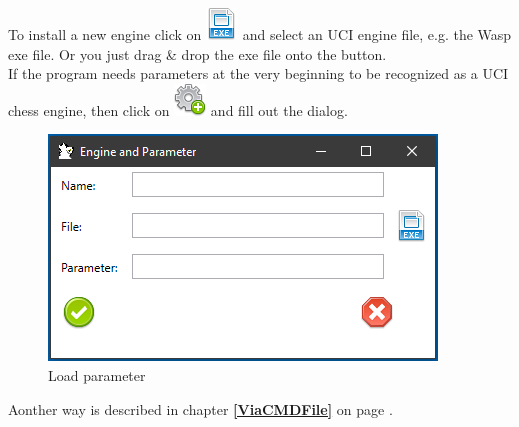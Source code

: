 \documentclass[11pt,a4paper]{article}
\begin{document}
To install a new engine click on \includegraphics[scale=0.5]{file_extension_exe.png} and select an UCI engine file, e.g. the Wasp exe file. Or you just drag \& drop the exe file onto the button.\\
If the program needs parameters at the very beginning to be recognized as a UCI chess engine, then click on \includegraphics[scale=0.5]{cog_add.png} and fill out the dialog.\\

\begin{figure}[H]
	\centering
	\includegraphics[scale=1.0]{loadEngine3.png}
	\caption{Load parameter}
	\label{fig:LoadEngine4}
\end{figure}
Aonther way is described in chapter \textbf{\ref{ViaCMDFile}  } on page \pageref{ViaCMDFile}.\\
\end{document}
